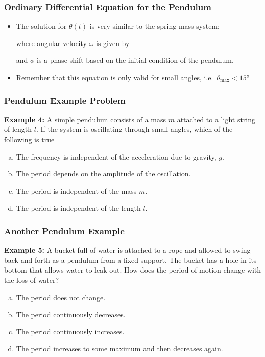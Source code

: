 \documentclass[12pt,compress,aspectratio=169]{beamer}
\begin{document}
\begin{frame}
  \frametitle{Ordinary Differential Equation for the Pendulum}
  \begin{itemize}
  \item The solution for $\theta(t)$ is very similar to the spring-mass system:


    \vspace{-0.15in}where angular velocity $\omega$ is given by
    

    \vspace{-0.1in} and $\phi$ is a phase shift based on the initial condition
    of the pendulum.
  \item Remember that this equation is only valid for small angles, i.e.\
    $\theta_\mathrm{max}<\ang{15}$
  \end{itemize}
\end{frame}


\begin{frame}
  \frametitle{Pendulum Example Problem}
  \textbf{Example 4:} A simple pendulum consists of a mass $m$ attached to a
  light string of length $l$. If the system is oscillating through small
  angles, which of the following is true
  \begin{enumerate}[(a)]
  \item The frequency is independent of the acceleration due to gravity, $g$.
  \item The period depends on the amplitude of the oscillation.
  \item The period is independent of the mass $m$.
  \item The period is independent of the length $l$.
  \end{enumerate}
\end{frame}


\begin{frame}
  \frametitle{Another Pendulum Example}
  \textbf{Example 5:} A bucket full of water is attached to a rope and allowed
  to swing back and forth as a pendulum from a fixed support. The bucket has a
  hole in its bottom that allows water to leak out. How does the period of
  motion change with the loss of water?
  \begin{enumerate}[(a)]
  \item The period does not change.
  \item The period continuously decreases.
  \item The period continuously increases.
  \item The period increases to some maximum and then decreases again.
  \end{enumerate}
\end{frame}
\end{document}
